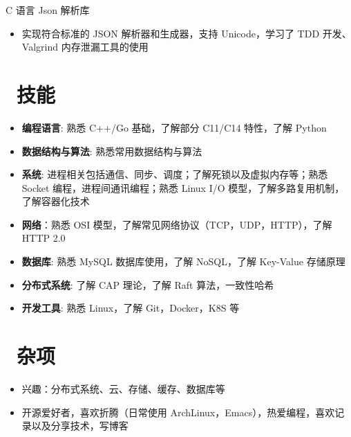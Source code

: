 \documentclass{resume}
\newcommand{\en}[1]{}
\newcommand{\zh}[1]{#1}
\begin{document}
\en{}
\zh{C 语言 Json 解析库}
\begin{itemize}
      \item \en{}
            \zh{实现符合标准的 JSON 解析器和生成器，支持 Unicode，学习了 TDD 开发、Valgrind 内存泄漏工具的使用}
\end{itemize}

\section{\faCogs\ \en{Skills}\zh{技能}}

\begin{itemize}[parsep=0.25ex]
      \item \en{\textbf{Programming Languages}: }
            \zh{\textbf{编程语言}: 熟悉 C++/Go 基础，了解部分 C11/C14 特性，了解 Python}

      \item \en{\textbf{Algorithm}: Familiar with common data structures and algorithms}
            \zh{\textbf{数据结构与算法}: 熟悉常用数据结构与算法}

      \item \en{\textbf{System}: }
            \zh{\textbf{系统}: 进程相关包括通信、同步、调度；了解死锁以及虚拟内存等；熟悉 Socket 编程，进程间通讯编程；熟悉 Linux I/O 模型，了解多路复用机制，了解容器化技术}

      \item \en{\textbf{Network}: }
            \zh{\textbf{网络}：熟悉 OSI 模型，了解常见网络协议（TCP，UDP，HTTP），了解 HTTP 2.0}

      \item \en{\textbf{DataBase}: Familiarity with database usage, understanding of indexing and concurrency control}
            \zh{\textbf{数据库}: 熟悉 MySQL 数据库使用，了解 NoSQL，了解 Key-Value 存储原理}

      \item \en{\textbf{Distributed Systems}: }
            \zh{\textbf{分布式系统}: 了解 CAP 理论，了解 Raft 算法，一致性哈希}%

      \item \en{\textbf{Developing Tools}: }
            \zh{\textbf{开发工具}: 熟悉 Linux，了解 Git，Docker，K8S 等}
\end{itemize}

\section{\faInfo\ \en{Miscellaneous}\zh{杂项}}
\begin{itemize}[parsep=0.25ex]
      \item \en{}
            \zh{兴趣：分布式系统、云、存储、缓存、数据库等}
      \item \en{}
            \zh{开源爱好者，喜欢折腾（日常使用 ArchLinux，Emacs），热爱编程，喜欢记录以及分享技术，写博客}

\end{itemize}
\end{document}
